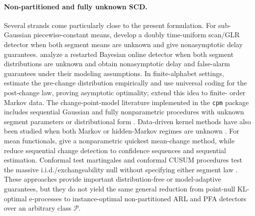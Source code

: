 \documentclass[12pt]{article}
\theoremstyle{spaced}
\theoremstyle{remark}
\newcommand{\calP}{\mathcal P}
\begin{document}
\paragraph{Non-partitioned and fully unknown SCD.}
Several strands come particularly close to the present formulation.
For sub-Gaussian piecewise-constant means, \citet{maillard2019sequential} develop a doubly time-uniform scan/GLR detector when both segment means are unknown and give nonasymptotic delay guarantees.
\citet{alami2020restarted} analyze a restarted Bayesian online detector when
both segment distributions are unknown and obtain nonasymptotic delay and
false-alarm guarantees under their modeling assumptions.  In finite-alphabet
settings, \citet{malik2021universal} estimate the pre-change distribution
empirically and use universal coding for the post-change law, proving
asymptotic optimality; \citet{gulaguli2025markov} extend this idea to finite-
order Markov data.  The change-point-model literature implemented in the
\texttt{cpm} package includes sequential Gaussian and fully nonparametric
procedures with unknown segment parameters or distributional form
\citep{ross2015cpm}.  Data-driven kernel methods have also been studied when
both Markov or hidden-Markov regimes are unknown \citep{zhang2022datadriven}.
For mean functionals, \citet{liang2022non} give a nonparametric quickest
mean-change method, while \citet{shekhar2023sequential,shekhar2023reducing}
reduce sequential change detection to confidence sequences and sequential
estimation.  Conformal test martingales and conformal CUSUM procedures test
the massive i.i.d./exchangeability null without specifying either segment
law \citep{vovk2003testing,vovk2021retrain,vovk2025cusum}.  These approaches
provide important distribution-free or model-adaptive guarantees, but they
do not yield the same general reduction from point-null KL-optimal
e-processes to instance-optimal non-partitioned ARL and PFA detectors over an
arbitrary class $\calP$.
\end{document}
